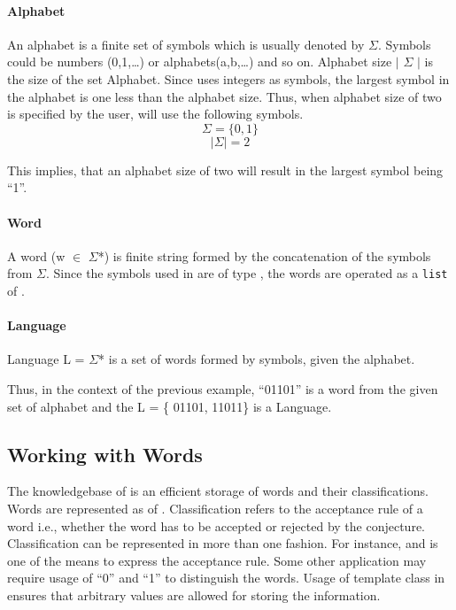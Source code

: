 \paragraph{Alphabet} An alphabet is a finite set of symbols which is usually denoted by $\Sigma$. 
Symbols could be numbers (0,1,\ldots) or alphabets(a,b,\ldots) and so on. 
Alphabet size $\mid$ $\Sigma$ $\mid$ is the size of the set Alphabet. Since \libalf uses integers as symbols, the largest symbol in the alphabet is one less than the alphabet size.
Thus, when alphabet size of two is specified by the user, \libalf will use the following symbols. 
\[
\Sigma = \{0,1\}
\]
\[
\mid \Sigma \mid = 2
\]

This implies, that an alphabet size of two will result in the largest symbol being ``1''.

\paragraph{Word} A word (w $\in$ $\Sigma$*) is finite string formed by the concatenation of the symbols from $\Sigma$. Since the symbols used in \libalf are of type \integer, the words are operated as a \texttt{list} of \integer.  

\paragraph{Language} Language L = $\Sigma$* is a set of words formed by symbols, given the alphabet.

Thus, in the context of the previous example, ``01101'' is a word from the given set of alphabet and the L = \{ 01101, 11011\} is a Language.

\subsection*{Working with Words} 
The knowledgebase of \libalf is an efficient storage of words and their classifications. Words are represented as \lists of \integer. Classification refers to the acceptance rule of a word i.e., whether the word has to be accepted or rejected by the conjecture. Classification can be represented in more than one fashion. For instance, \true and \false is one of the means to express the acceptance rule. Some other application may require usage of ``0'' and ``1'' to distinguish the words. Usage of template class in \libalf ensures that arbitrary values are allowed for storing the information. 

